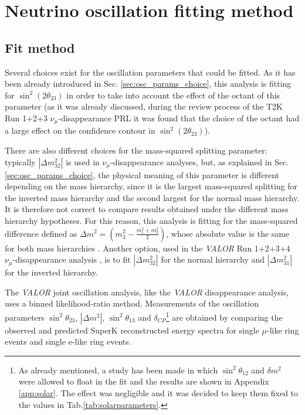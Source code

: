 
\section{Neutrino oscillation fitting method}
\label{sec:neutrino_oscillation_fitting}



\subsection {Fit method}
\label{sec:oscfit_method}

Several choices exist for the oscillation parameters that could be fitted. 
As it has been already introduced in Sec. \ref{sec:osc_params_choice}, this analysis is 
fitting for $\sin^2(2\theta_{23})$ in order to take into account the effect of the octant 
of this parameter (as it was already discussed, during the review process of the T2K Run 1+2+3 $\nu_{\mu}$-disappearance PRL \cite{T2KRun123Disapp} it was found that the choice of the octant had a large effect on the confidence contour in $\sin^2(2\theta_{23})$).

There are also different choices for the mass-squared splitting parameter: typically $|\Delta m^{2}_{32}|$ is used in $\nu_{\mu}$-disappearance 
analyses, but, as explained in Sec.\ref{sec:osc_params_choice}, the physical meaning of this parameter is different depending on the mass hierarchy, since it is the largest mass-squared splitting for the inverted mass
hierarchy and the second largest for the normal mass hierarchy. 
It is therefore not correct to compare results obtained under the different mass hierarchy hypotheses.
For this reason, this analysis is fitting for the mass-squared difference defined as
$\Delta m^{2} = \left(m_{3}^{2} - \frac {m_{1}^{2}+m_{2}^{2}} {2} \right)$,
whose absolute value is the same for both mass hierarchies  \cite{FogliLisi}.
Another option, used in the {\em VALOR} Run 1+2+3+4 $\nu_{\mu}$-disappearance analysis \cite{OurRun1234DisappAnalysis3Flavour}, is to fit $|\Delta m^{2}_{32}|$ for the normal hierarchy and $|\Delta m^{2}_{31}|$ for the inverted hierarchy. 

The {\em VALOR} joint oscillation analysis, like the {\em VALOR} disappearance analysis, uses a binned likelihood-ratio method.
Measurements of the oscillation parameters $\sin^{2}\theta_{23}$, $|\Delta m^{2}|$,  $\sin^{2}\theta_{13}$ and $\delta_{CP}$\footnote{
   As already mentioned, a study has been made in which $\sin^{2}\theta_{12}$ and $\delta m^{2}$ were allowed to float in the fit and the results are shown in Appendix \ref{app:solar}. 
   The effect was negligible and it was decided to keep them fixed to the values in Tab.\ref{tab:solarparameters}.
}
are obtained by comparing the observed and predicted SuperK reconstructed energy spectra
for single $\mu$-like ring events and single e-like ring events. 

